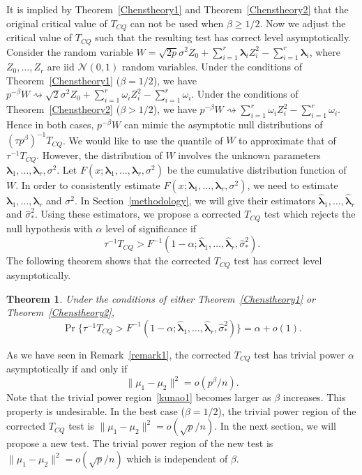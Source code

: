 \documentclass[times,sort&compress,3p]{elsarticle}
\newcommand{\bfsym}[1]{\ensuremath{\boldsymbol{#1}}}
\def\blambda {\bfsym {\lambda}}        \def\bLambda {\bfsym {\Lambda}}
\theoremstyle{plain}
\newtheorem{theorem}{\quad\quad Theorem}
\theoremstyle{definition}
\theoremstyle{remark}
\begin{document}
It is implied by Theorem~\ref{Chenstheory1} and Theorem~\ref{Chenstheory2} that the original critical value of $T_{CQ}$ can not be used when $\beta\geq 1/2$.
Now we adjust the critical value of $T_{CQ}$ such that the resulting test has correct level asymptotically.
Consider the random variable
$
W=
\sqrt{2p}\sigma^2 Z_0
+
        \sum_{i=1}^r \blambda_i Z_i^2
            -
        \sum_{i=1}^r \blambda_i
        $, 
where $Z_0,\ldots,Z_r$ are iid $\mathcal{N}(0,1)$ random variables.
Under the conditions of Theorem~\ref{Chenstheory1} ($\beta=1/2$), we have
$
  p^{-\beta}W\rightsquigarrow
\sqrt{2}\sigma^2 Z_0 + \sum_{i=1}^r \omega_i Z_i^2 -\sum_{i=1}^r \omega_i
$.
Under the conditions of Theorem~\ref{Chenstheory2} ($\beta>1/2$), we have
$
 p^{-\beta}W\rightsquigarrow
\sum_{i=1}^r \omega_i Z_i^2 -\sum_{i=1}^r \omega_i.
$
Hence in both cases, $p^{-\beta}W$ can mimic the asymptotic null distributions of $(\tau p^{\beta})^{-1}T_{CQ}$.
We would like to use the quantile of $W$ to approximate that of $\tau^{-1}T_{CQ}$.
        However, the distribution of $W$ involves the unknown parameters $\blambda_1,\ldots,\blambda_r,\sigma^2$.
Let $F(x;\blambda_1,\ldots,\blambda_r,\sigma^2)$ be the cumulative distribution function of $W$.
In order to consistently estimate $F(x;\blambda_1,\ldots,\blambda_r,\sigma^2)$, we need to estimate $\blambda_1,\ldots,\blambda_r$ and $\sigma^2$.
In Section~\ref{methodology}, we will give their estimators $\hat{\blambda}_1,\ldots,\hat{\blambda}_r$ and $\hat{\sigma}_{*}^2$. 
Using these estimators, we propose a corrected $T_{CQ}$ test which rejects the null hypothesis with $\alpha$ level of significance if
$$
\tau^{-1}{T_{CQ}}> F^{-1}(1-\alpha;\hat{\blambda}_1,\ldots,\hat{\blambda}_r,\hat{\sigma}_*^2).
$$
The following theorem shows that the corrected $T_{CQ}$ test has correct level asymptotically.

\begin{theorem}\label{theoremRev}
Under the conditions of either Theorem~\ref{Chenstheory1} or Theorem~\ref{Chenstheory2},
$$
\Pr\{\tau^{-1}{T_{CQ}}> F^{-1}(1-\alpha;\hat{\blambda}_1,\ldots,\hat{\blambda}_r,\hat{\sigma}_*^2)\}=\alpha+o(1).
$$
\end{theorem}





As we have seen in Remark~\ref{remark1}, the corrected $T_{CQ}$ test has trivial power $\alpha$ asymptotically if and only if
\begin{equation}\label{kunao1}
\|\mu_1-\mu_2\|^2 = o( p^{\beta}/n).
\end{equation}
Note that the trivial power region~\eqref{kunao1} becomes larger as $\beta$ increases.
This property is undesirable.
In the best case ($\beta=1/2$), the trivial power region of the corrected $T_{CQ}$ test is $\|\mu_1-\mu_2\|^2=o(\sqrt{p}/n)$.
In the next section, we will propose a new test. The trivial power region of the new test is $\|\mu_1-\mu_2\|^2=o(\sqrt{p}/n)$ which is independent of $\beta$.
\end{document}
